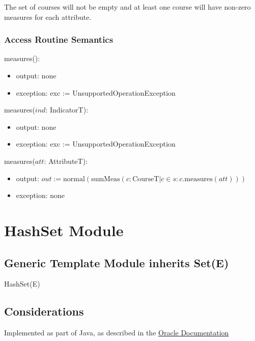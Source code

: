 \documentclass[12pt]{article}
\begin{document}
The set of courses will not be empty and at least one course will have non-zero
measures for each attribute.

\subsubsection* {Access Routine Semantics}

\noindent measures():
\begin{itemize}
\item output: none
\item exception: exc := UnsupportedOperationException
\end{itemize}

\noindent measures($\mathit{ind}$: IndicatorT):
\begin{itemize}
\item output: none
\item exception: exc := UnsupportedOperationException
\end{itemize}

\noindent measures($\mathit{att}$: AttributeT):
\begin{itemize}
\item output:
  $out := \text{normal} (\text{sumMeas}(c: \text{CourseT} | c \in s :
  \mathit{c}.\text{measures}(att)))$
\item exception: none
\end{itemize}

\newpage

\section* {HashSet Module}

\subsection* {Generic Template Module inherits Set(E)}

HashSet(E)

\subsection* {Considerations}

Implemented as part of Java, as described in the
\href{https://docs.oracle.com/javase/8/docs/api/java/util/HashSet.html} {Oracle Documentation}
\end{document}
